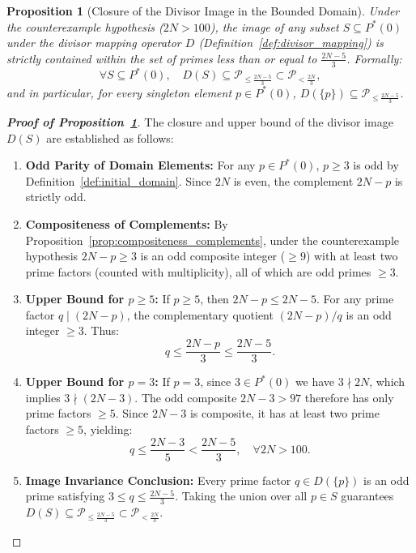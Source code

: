 \documentclass[11pt,a4paper]{article}
\newtheorem{proposition}[theorem]{Proposition}
\theoremstyle{definition}
\begin{document}
\begin{proposition}[Closure of the Divisor Image in the Bounded Domain]
\label{prop:closure}
Under the counterexample hypothesis ($2N > 100$), the image of any subset $S \subseteq P^*(0)$ under the divisor mapping operator $D$ (Definition~\ref{def:divisor_mapping}) is strictly contained within the set of primes less than or equal to $\frac{2N - 5}{3}$. Formally:
\[
\forall S \subseteq P^*(0), \quad D(S) \subseteq \mathcal{P}_{\le \frac{2N - 5}{3}} \subset \mathcal{P}_{< \frac{2N}{3}},
\]
and in particular, for every singleton element $p \in P^*(0)$, $D(\{p\}) \subseteq \mathcal{P}_{\le \frac{2N - 5}{3}}$.
\end{proposition}
\begin{proof}[\textbf{Proof of Proposition~\ref{prop:closure}}]
The closure and upper bound of the divisor image $D(S)$ are established as follows:
\begin{enumerate}
    \item \textbf{Odd Parity of Domain Elements:} For any $p \in P^*(0)$, $p \ge 3$ is odd by Definition~\ref{def:initial_domain}. Since $2N$ is even, the complement $2N - p$ is strictly odd.
    \item \textbf{Compositeness of Complements:} By Proposition~\ref{prop:compositeness_complements}, under the counterexample hypothesis $2N - p \ge 3$ is an odd composite integer ($\ge 9$) with at least two prime factors (counted with multiplicity), all of which are odd primes $\ge 3$.
    \item \textbf{Upper Bound for $p \ge 5$:} If $p \ge 5$, then $2N - p \le 2N - 5$. For any prime factor $q \mid (2N - p)$, the complementary quotient $(2N - p)/q$ is an odd integer $\ge 3$. Thus:
    \[
    q \le \frac{2N - p}{3} \le \frac{2N - 5}{3}.
    \]
    \item \textbf{Upper Bound for $p = 3$:} If $p = 3$, since $3 \in P^*(0)$ we have $3 \nmid 2N$, which implies $3 \nmid (2N - 3)$. The odd composite $2N - 3 > 97$ therefore has only prime factors $\ge 5$. Since $2N - 3$ is composite, it has at least two prime factors $\ge 5$, yielding:
    \[
    q \le \frac{2N - 3}{5} < \frac{2N - 5}{3}, \quad \forall 2N > 100.
    \]
    \item \textbf{Image Invariance Conclusion:} Every prime factor $q \in D(\{p\})$ is an odd prime satisfying $3 \le q \le \frac{2N - 5}{3}$. Taking the union over all $p \in S$ guarantees $D(S) \subseteq \mathcal{P}_{\le \frac{2N-5}{3}} \subset \mathcal{P}_{<\frac{2N}{3}}$.
\end{enumerate}
\end{proof}
\end{document}
